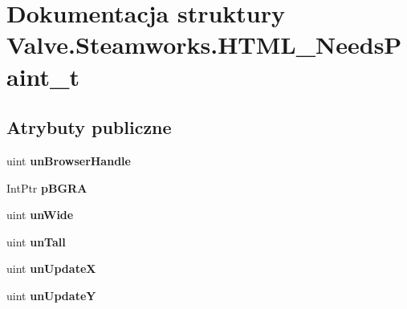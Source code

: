 \hypertarget{struct_valve_1_1_steamworks_1_1_h_t_m_l___needs_paint__t}{}\section{Dokumentacja struktury Valve.\+Steamworks.\+H\+T\+M\+L\+\_\+\+Needs\+Paint\+\_\+t}
\label{struct_valve_1_1_steamworks_1_1_h_t_m_l___needs_paint__t}
\subsection*{Atrybuty publiczne}
\begin{DoxyCompactItemize}
\item 
\mbox{\label{struct_valve_1_1_steamworks_1_1_h_t_m_l___needs_paint__t_a0e0e9c4fe75533eb8dcb942e1725252f}} 
uint {\bfseries un\+Browser\+Handle}
\item 
\mbox{\label{struct_valve_1_1_steamworks_1_1_h_t_m_l___needs_paint__t_aab193442feeef24931a06be996d48ac7}} 
Int\+Ptr {\bfseries p\+B\+G\+RA}
\item 
\mbox{\label{struct_valve_1_1_steamworks_1_1_h_t_m_l___needs_paint__t_a4129fee4d4e65fa61e01ed850c86bce6}} 
uint {\bfseries un\+Wide}
\item 
\mbox{\label{struct_valve_1_1_steamworks_1_1_h_t_m_l___needs_paint__t_a0f8237b50327d57240a87aa75ab22f42}} 
uint {\bfseries un\+Tall}
\item 
\mbox{\label{struct_valve_1_1_steamworks_1_1_h_t_m_l___needs_paint__t_acc6f0d583033b2160de06e6b3cdaa945}} 
uint {\bfseries un\+UpdateX}
\item 
\mbox{\label{struct_valve_1_1_steamworks_1_1_h_t_m_l___needs_paint__t_ac23fcf135e83cd8e3f9d109cc0d652f9}} 
uint {\bfseries un\+UpdateY}
\item 
\mbox{\label{struct_valve_1_1_steamworks_1_1_h_t_m_l___needs_paint__t_a74a3bbae302d8249ae737085bca3a147}} 

\end{DoxyCompactItemize}
